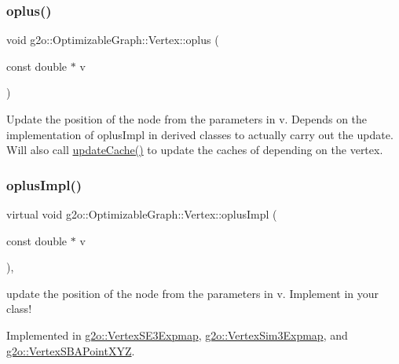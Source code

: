 \subsubsection{\texorpdfstring{oplus()}{oplus()}}
{\footnotesize\ttfamily void g2o\+::\+Optimizable\+Graph\+::\+Vertex\+::oplus (\begin{DoxyParamCaption}\item[{const double $\ast$}]{v }\end{DoxyParamCaption})\hspace{0.3cm}{\ttfamily [inline]}}

Update the position of the node from the parameters in v. Depends on the implementation of oplus\+Impl in derived classes to actually carry out the update. Will also call \mbox{\hyperlink{classg2o_1_1_optimizable_graph_1_1_vertex_ab5972c8ba6834c4dcb8a2319e9bf3070}{update\+Cache()}} to update the caches of depending on the vertex. \mbox{\label{classg2o_1_1_optimizable_graph_1_1_vertex_a4537a46afb8d12c3f18c88ba9601c625}} 
\subsubsection{\texorpdfstring{oplus\+Impl()}{oplusImpl()}}
{\footnotesize\ttfamily virtual void g2o\+::\+Optimizable\+Graph\+::\+Vertex\+::oplus\+Impl (\begin{DoxyParamCaption}\item[{const double $\ast$}]{v }\end{DoxyParamCaption})\hspace{0.3cm}{\ttfamily [protected]}, {}}

update the position of the node from the parameters in v. Implement in your class! 

Implemented in \mbox{\hyperlink{classg2o_1_1_vertex_s_e3_expmap_a52592993e7ab5de6fe4bb0f9e00c4d39}{g2o\+::\+Vertex\+S\+E3\+Expmap}}, \mbox{\hyperlink{classg2o_1_1_vertex_sim3_expmap_abef7e4d10825caa129984f69251508c2}{g2o\+::\+Vertex\+Sim3\+Expmap}}, and \mbox{\hyperlink{classg2o_1_1_vertex_s_b_a_point_x_y_z_aa2a13838edc46ed5395fee5c07c4c8ea}{g2o\+::\+Vertex\+S\+B\+A\+Point\+X\+YZ}}.

\mbox{\label{classg2o_1_1_optimizable_graph_1_1_vertex_a3e36d925dbda1c574a285826ade5909a}} 
